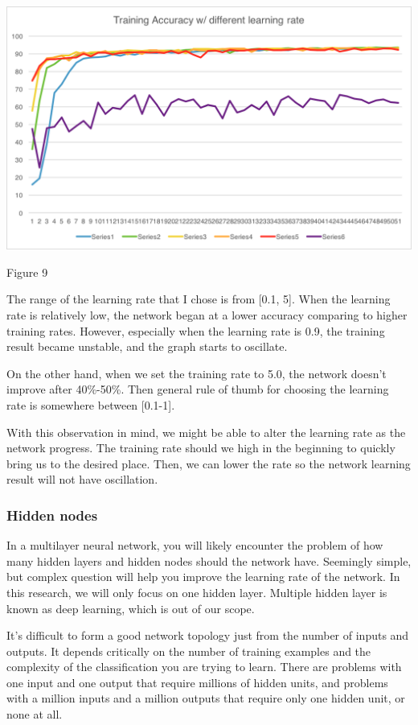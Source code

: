 \documentclass[]{article}
\begin{document}
\begin{multicols}{2}
\centerline{\includegraphics[width=1\linewidth]{graph5}}
\centerline{Figure 9}
\vspace{0.3cm}

The range of the learning rate that I chose is from [0.1, 5]. When the learning rate is relatively low, the network began at a lower accuracy comparing to higher training rates. However, especially when the learning rate is 0.9, the training result became unstable, and the graph starts to oscillate. 

On the other hand, when we set the training rate to 5.0, the network doesn't improve after 40\%-50\%. Then general rule of thumb for choosing the learning rate is somewhere between [0.1-1]. 

With this observation in mind, we might be able to alter the learning rate as the network progress. The training rate should we high in the beginning to quickly bring us to the desired place. Then, we can lower the rate so the network learning result will not have oscillation. 
 
\subsubsection{Hidden nodes}

In a multilayer neural network, you will likely encounter the problem of how many hidden layers and hidden nodes should the network have. Seemingly simple, but complex question will help you improve the learning rate of the network. In this research, we will only focus on one hidden layer. Multiple hidden layer is known as deep learning, which is out of our scope. 

It's difficult to form a good network topology just from the number of inputs and outputs. It depends critically on the number of training examples and the complexity of the classification you are trying to learn. There are problems with one input and one output that require millions of hidden units, and problems with a million inputs and a million outputs that require only one hidden unit, or none at all.


\end{multicols}
\end{document}
